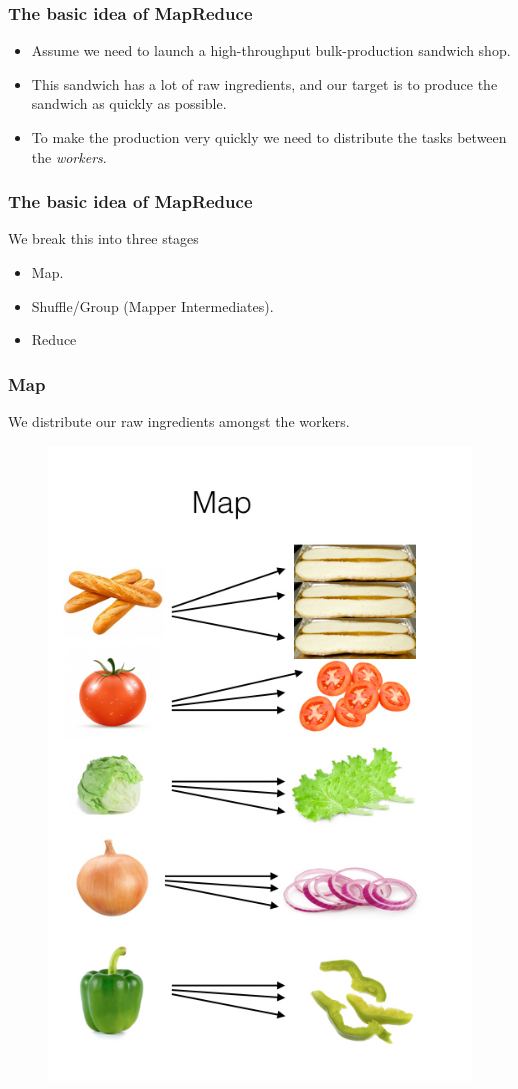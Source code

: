 \begin{frame}
	\frametitle{The basic idea of MapReduce}
	\begin{itemize}  [<+->]
		\item Assume we need to launch a high-throughput bulk-production sandwich shop. 
		\item This sandwich has a lot of raw ingredients, and our target is to produce the sandwich as quickly as possible.
		\item To make the production very quickly we need to distribute the tasks between the  \textcolor{offyellow}{\textit{workers}}.				
	\end{itemize}
\end{frame}
\begin{frame}
	\frametitle{The basic idea of MapReduce}
	We break this into three stages
	\begin{itemize}  [<+->]
		\item Map.
		\item Shuffle/Group (Mapper Intermediates).
		\item Reduce			
	\end{itemize}
\end{frame}
\begin{frame}
	\frametitle{Map}
	We distribute our raw ingredients amongst the workers.
	\begin{figure}
		\includegraphics[width=.5\textwidth,height=.7\textheight]{./Figures/chapter-02/map-reduce-map-side.jpeg}
	\end{figure}			
\end{frame}
